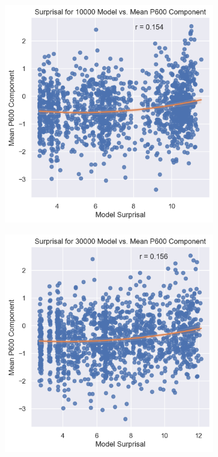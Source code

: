 \documentclass{IEEEtran}
\begin{document}
\begin{figure}[h]
    \centering
    \begin{subfigure}{0.4\textwidth}
        \centering
        \includegraphics[width=\textwidth]{surprisal_vs_p600/10000.png}
    \end{subfigure}
    \begin{subfigure}{0.4\textwidth}
        \centering
        \includegraphics[width=\textwidth]{surprisal_vs_p600/30000.png}
    \end{subfigure}
\end{figure}
\end{document}
